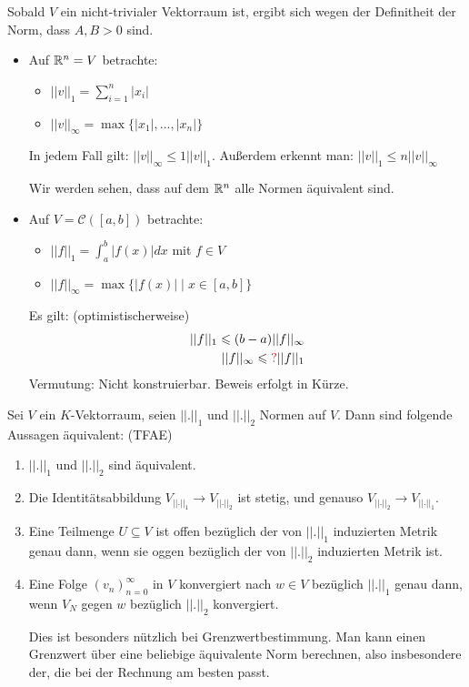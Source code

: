 \documentclass[main.tex]{subfiles}
\begin{document}
\begin{Bemerkung}
  Sobald $V$ ein nicht-trivialer Vektorraum ist, ergibt sich wegen der Definitheit der Norm, dass $A,B > 0$ sind.
\end{Bemerkung}

\begin{Beispiel}
  \begin{itemize}
    \item Auf $\R^n = V$ betrachte:
      \begin{itemize}
        \item $||v||_1 = \sum \limits_{i = 1}^n |x_i|$
        \item $||v||_\infty = \max \{|x_1|,...,|x_n|\}$
      \end{itemize}
      In jedem Fall gilt: $||v||_\infty \leq 1 ||v||_1$. Außerdem erkennt man: $||v||_1 \leq n ||v||_\infty$
      \begin{Bemerkung}
        Wir werden sehen, dass auf dem $\R^n$ alle Normen äquivalent sind.
      \end{Bemerkung}
    \item Auf $V = \mathcal{C}([a,b])$ betrachte:
      \begin{itemize}
        \item $||f||_1 = \int_a^b |f(x)|dx$ mit $f \in V$
        \item $||f||_\infty = \max\{|f(x)| \mid x \in [a,b]\}$
      \end{itemize}
      Es gilt: (optimistischerweise)
      $$\begin{aligned}
        ||f||_1 \leq (b-a) ||f||_\infty \\
        ||f||_\infty \leq {\color{red}?}||f||_1
      \end{aligned}$$
      Vermutung: Nicht konstruierbar. Beweis erfolgt in Kürze.
  \end{itemize}
\end{Beispiel}

\begin{Theorem}
  Sei $V$ ein $K$-Vektorraum, seien $||.||_1$ und $||.||_2$ Normen auf $V$. Dann sind folgende Aussagen äquivalent: (TFAE)
  \begin{enumerate}
    \item $||.||_1$ und $||.||_2$ sind äquivalent.
    \item Die Identitätsabbildung $V_{||.||_1} \to V_{||.||_2}$ ist stetig, und genauso $V_{||.||_2} \to V_{||.||_1}$.
    \item Eine Teilmenge $U \subseteq V$ ist offen bezüglich der von $||.||_1$ induzierten Metrik genau dann, wenn sie oggen bezüglich der von $||.||_2$ induzierten Metrik ist.
    \item Eine Folge $(v_n)_{n=0}^\infty$ in $V$ konvergiert nach $w \in V$ bezüglich $||.||_1$ genau dann, wenn $V_N$ gegen $w$ bezüglich $||.||_2$ konvergiert.
      \begin{Bemerkung}
        Dies ist besonders nützlich bei Grenzwertbestimmung. Man kann einen Grenzwert über eine beliebige äquivalente Norm berechnen, also insbesondere der, die bei der Rechnung am besten passt.
      \end{Bemerkung}
  \end{enumerate}
\end{Theorem}
\end{document}
